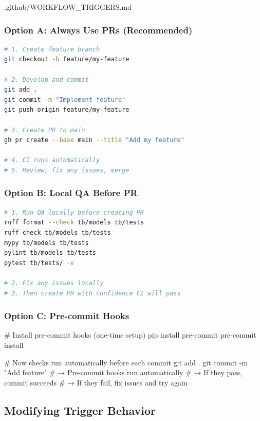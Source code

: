 \begin{relocated}{.github/WORKFLOW_TRIGGERS.md}
\subsubsection{Option A: Always Use PRs (Recommended)}\label{um:flow:workflow-triggers:option-a-always-use-prs-recommended}

\begin{lstlisting}[language=bash]
# 1. Create feature branch
git checkout -b feature/my-feature

# 2. Develop and commit
git add .
git commit -m "Implement feature"
git push origin feature/my-feature

# 3. Create PR to main
gh pr create --base main --title "Add my feature"

# 4. CI runs automatically
# 5. Review, fix any issues, merge
\end{lstlisting}

\subsubsection{Option B: Local QA Before PR}\label{um:flow:workflow-triggers:option-b-local-qa-before-pr}

\begin{lstlisting}[language=bash]
# 1. Run QA locally before creating PR
ruff format --check tb/models tb/tests
ruff check tb/models tb/tests
mypy tb/models tb/tests
pylint tb/models tb/tests
pytest tb/tests/ -v

# 2. Fix any issues locally
# 3. Then create PR with confidence CI will pass
\end{lstlisting}

\subsubsection{Option C: Pre-commit Hooks}\label{um:flow:workflow-triggers:option-c-pre-commit-hooks}

\begin{textblock}
# Install pre-commit hooks (one-time setup)
pip install pre-commit
pre-commit install

# Now checks run automatically before each commit
git add .
git commit -m "Add feature"
# → Pre-commit hooks run automatically
# → If they pass, commit succeeds
# → If they fail, fix issues and try again
\end{textblock}

\subsection{Modifying Trigger Behavior}\label{um:flow:workflow-triggers:modifying-trigger-behavior}


\end{relocated}
